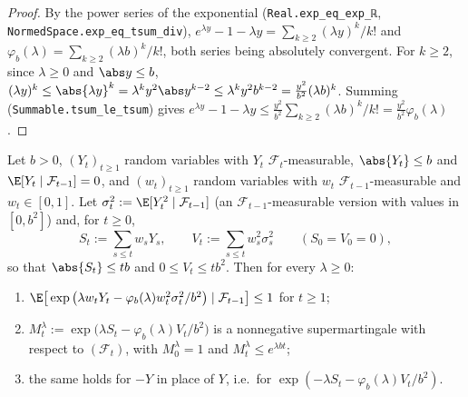 \begin{proof}
\leanok
By the power series of the exponential (\texttt{Real.exp\_eq\_exp\_ℝ},
\texttt{NormedSpace.exp\_eq\_tsum\_div}), $e^{\lambda y} - 1 - \lambda y = \sum_{k \ge 2} (\lambda y)^k/k!$
and $\varphi_b(\lambda) = \sum_{k \ge 2} (\lambda b)^k/k!$, both series being absolutely convergent.
For $k \ge 2$, since $\lambda \ge 0$ and $\abs y \le b$,
$(\lambda y)^k \le \abs{\lambda y}^k = \lambda^k y^2 \abs y^{k - 2} \le \lambda^k y^2 b^{k - 2} = \frac{y^2}{b^2}(\lambda b)^k$.
Summing (\texttt{Summable.tsum\_le\_tsum}) gives
$e^{\lambda y} - 1 - \lambda y \le \frac{y^2}{b^2} \sum_{k \ge 2} (\lambda b)^k/k! = \frac{y^2}{b^2}\varphi_b(\lambda)$.
\end{proof}

\begin{lemma}\label{lem:bernstein_exp_supermartingale}
\leanok
Let $b > 0$, $(Y_t)_{t \ge 1}$ random variables with $Y_t$ $\mathcal F_t$-measurable,
$\abs{Y_t} \le b$ and $\E[Y_t \mid \mathcal F_{t-1}] = 0$, and $(w_t)_{t \ge 1}$ random variables
with $w_t$ $\mathcal F_{t-1}$-measurable and $w_t \in [0, 1]$. Let $\sigma_t^2 := \E[Y_t^2 \mid \mathcal F_{t-1}]$
(an $\mathcal F_{t-1}$-measurable version with values in $[0, b^2]$) and, for $t \ge 0$,
\[
  S_t := \sum_{s \le t} w_s Y_s, \qquad V_t := \sum_{s \le t} w_s^2 \sigma_s^2 \qquad (S_0 = V_0 = 0),
\]
so that $\abs{S_t} \le tb$ and $0 \le V_t \le tb^2$. Then for every $\lambda \ge 0$:
\begin{enumerate}
\item[(i)] $\E\big[\exp\big(\lambda w_t Y_t - \varphi_b(\lambda) w_t^2 \sigma_t^2/b^2\big) \mid \mathcal F_{t-1}\big] \le 1$ for $t \ge 1$;
\item[(ii)] $M^\lambda_t := \exp\big(\lambda S_t - \varphi_b(\lambda) V_t/b^2\big)$ is a nonnegative
  supermartingale with respect to $(\mathcal F_t)$, with $M^\lambda_0 = 1$ and $M^\lambda_t \le e^{\lambda b t}$;
\item[(iii)] the same holds for $-Y$ in place of $Y$, i.e.\ for $\exp(-\lambda S_t - \varphi_b(\lambda) V_t/b^2)$.
\end{enumerate}
\end{lemma}

